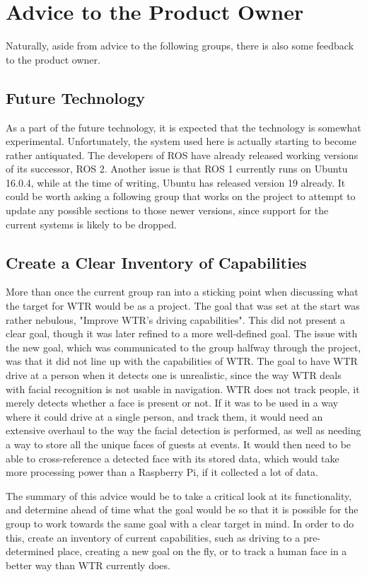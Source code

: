 \section{Advice to the Product Owner}
Naturally, aside from advice to the following groups, there is also some feedback to the product owner.

\subsection{Future Technology}
As a part of the future technology, it is expected that the technology is somewhat experimental.
Unfortunately, the system used here is actually starting to become rather antiquated.
The developers of ROS have already released working versions of its successor, ROS 2.
Another issue is that ROS 1 currently runs on Ubuntu 16.0.4, while at the time of writing, Ubuntu has released version 19 already.
It could be worth asking a following group that works on the project to attempt to update any possible sections to those newer versions, since support for the current systems is likely to be dropped.

\subsection{Create a Clear Inventory of Capabilities}
More than once the current group ran into a sticking point when discussing what the target for WTR would be as a project.
The goal that was set at the start was rather nebulous,  "Improve WTR's driving capabilities".
This did not present a clear goal, though it was later refined to a more well-defined goal.
The issue with the new goal, which was communicated to the group halfway through the project, was that it did not line up with the capabilities of WTR.
The goal to have WTR drive at a person when it detects one is unrealistic, since the way WTR deals with facial recognition is not usable in navigation.
WTR does not track people, it merely detects whether a face is present or not.
If it was to be used in a way where it could drive at a single person, and track them, it would need an extensive overhaul to the way the facial detection is performed, as well as needing a way to store all the unique faces of guests at events.
It would then need to be able to cross-reference a detected face with its stored data, which would take more processing power than a Raspberry Pi, if it collected a lot of data.

The summary of this advice would be to take a critical look at its functionality, and determine ahead of time what the goal would be so that it is possible for the group to work towards the same goal with a clear target in mind.
In order to do this, create an inventory of current capabilities, such as driving to a pre-determined place, creating a new goal on the fly, or to track a human face in a better way than WTR currently does.

